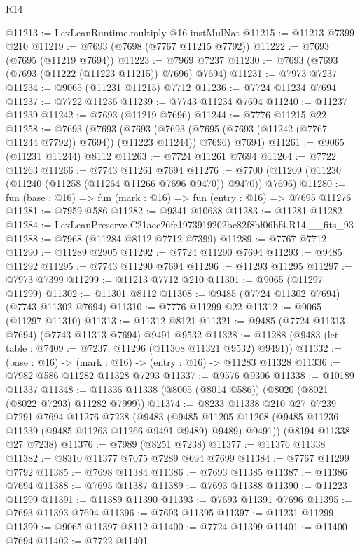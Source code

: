 \begin{lexlean}{R14}
\begin{coremodule}
@11213 := LexLeanRuntime.multiply @16 instMulNat
@11215 := @11213 @7399 @210
@11219 := @7693 (@7698 (@7767 @11215 @7792))
@11222 := @7693 (@7695 (@11219 @7694))
@11223 := @7969 @7237
@11230 := @7693 (@7693 (@7693 (@11222 (@11223 @11215)) @7696) @7694)
@11231 := @7973 @7237
@11234 := @9065 (@11231 @11215) @7712
@11236 := @7724 @11234 @7694
@11237 := @7722 @11236
@11239 := @7743 @11234 @7694
@11240 := @11237 @11239
@11242 := @7693 (@11219 @7696)
@11244 := @7776 @11215 @22
@11258 := @7693
    (@7693
      (@7693 (@7693 (@7695 (@7693 (@11242 (@7767 @11244 @7792)) @7694)) (@11223 @11244)) @7696)
      @7694)
@11261 := @9065 (@11231 @11244) @8112
@11263 := @7724 @11261 @7694
@11264 := @7722 @11263
@11266 := @7743 @11261 @7694
@11276 := @7700 (@11209 (@11230 (@11240 (@11258 (@11264 @11266 @7696 @9470)) @9470)) @7696)
@11280 := fun (base : @16) => fun (mark : @16) => fun (entry : @16) => @7695 @11276
@11281 := @7959 @586
@11282 := @9341 @10638
@11283 := @11281 @11282
@11284 := LexLeanPreserve.C21aec26fe1973919202bc82f8bf06bf4.R14.__fits_93
@11288 := @7968 (@11284 @8112 @7712 @7399)
@11289 := @7767 @7712
@11290 := @11289 @2905
@11292 := @7724 @11290 @7694
@11293 := @9485 @11292
@11295 := @7743 @11290 @7694
@11296 := @11293 @11295
@11297 := @7973 @7399
@11299 := @11213 @7712 @210
@11301 := @9065 (@11297 @11299)
@11302 := @11301 @8112
@11308 := @9485 (@7724 @11302 @7694) (@7743 @11302 @7694)
@11310 := @7776 @11299 @22
@11312 := @9065 (@11297 @11310)
@11313 := @11312 @8121
@11321 := @9485 (@7724 @11313 @7694) (@7743 @11313 @7694) @9491 @9532
@11328 := @11288 (@9483 (let table : @7409 := @7237; @11296 (@11308 @11321 @9532) @9491))
@11332 := (base : @16) -> (mark : @16) -> (entry : @16) -> @11283 @11328
@11336 := @7982 @586 @11282 @11328 @7293
@11337 := @9576 @9306
@11338 := @10189 @11337
@11348 := @11336 @11338 (@8005 (@8014 @586)) (@8020 (@8021 (@8022 @7293) @11282 @7999))
@11374 := @8233
    @11338
    @210
    @27
    @7239
    @7291
    @7694
    @11276
    @7238
    (@9483
      (@9485 @11205 @11208 (@9485 @11236 @11239 (@9485 @11263 @11266 @9491 @9489) @9489) @9491))
    (@8194 @11338 @27 @7238)
@11376 := @7989 (@8251 @7238)
@11377 := @11376 @11338
@11382 := @8310 @11377 @7075 @7289 @694 @7699
@11384 := @7767 @11299 @7792
@11385 := @7698 @11384
@11386 := @7693 @11385
@11387 := @11386 @7694
@11388 := @7695 @11387
@11389 := @7693 @11388
@11390 := @11223 @11299
@11391 := @11389 @11390
@11393 := @7693 @11391 @7696
@11395 := @7693 @11393 @7694
@11396 := @7693 @11395
@11397 := @11231 @11299
@11399 := @9065 @11397 @8112
@11400 := @7724 @11399
@11401 := @11400 @7694
@11402 := @7722 @11401

\end{coremodule}
\end{lexlean}
